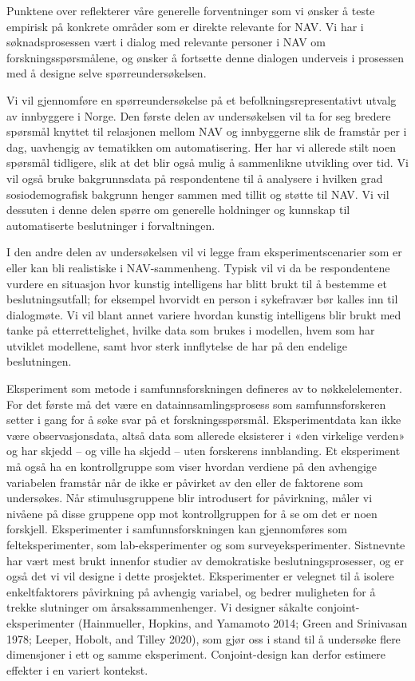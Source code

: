 \documentclass[
]{book}
\begin{document}
Punktene over reflekterer våre generelle forventninger som vi ønsker å teste empirisk på konkrete områder som er direkte relevante for NAV.
Vi har i søknadsprosessen vært i dialog med relevante personer i NAV om forskningsspørsmålene, og ønsker å fortsette denne dialogen underveis i prosessen med å designe selve spørreundersøkelsen.

Vi vil gjennomføre en spørreundersøkelse på et befolkningsrepresentativt utvalg av innbyggere i Norge.
Den første delen av undersøkelsen vil ta for seg bredere spørsmål knyttet til relasjonen mellom NAV og innbyggerne slik de framstår per i dag, uavhengig av tematikken om automatisering.
Her har vi allerede stilt noen spørsmål tidligere, slik at det blir også mulig å sammenlikne utvikling over tid.
Vi vil også bruke bakgrunnsdata på respondentene til å analysere i hvilken grad sosiodemografisk bakgrunn henger sammen med tillit og støtte til NAV.
Vi vil dessuten i denne delen spørre om generelle holdninger og kunnskap til automatiserte beslutninger i forvaltningen.

I den andre delen av undersøkelsen vil vi legge fram eksperimentscenarier som er eller kan bli realistiske i NAV-sammenheng. Typisk vil vi da be respondentene vurdere en situasjon hvor kunstig intelligens har blitt brukt til å bestemme et beslutningsutfall; for eksempel hvorvidt en person i sykefravær bør kalles inn til dialogmøte. Vi vil blant annet variere hvordan kunstig intelligens blir brukt med tanke på etterrettelighet, hvilke data som brukes i modellen, hvem som har utviklet modellene, samt hvor sterk innflytelse de har på den endelige beslutningen.

Eksperiment som metode i samfunnsforskningen defineres av to nøkkelelementer.
For det første må det være en datainnsamlingsprosess som samfunnsforskeren setter i gang for å søke svar på et forskningsspørsmål.
Eksperimentdata kan ikke være observasjonsdata, altså data som allerede eksisterer i «den virkelige verden» og har skjedd -- og ville ha skjedd -- uten forskerens innblanding.
Et eksperiment må også ha en kontrollgruppe som viser hvordan verdiene på den avhengige variabelen framstår når de ikke er påvirket av den eller de faktorene som undersøkes.
Når stimulusgruppene blir introdusert for påvirkning, måler vi nivåene på disse gruppene opp mot kontrollgruppen for å se om det er noen forskjell.
Eksperimenter i samfunnsforskningen kan gjennomføres som felteksperimenter, som lab-eksperimenter og som surveyeksperimenter.
Sistnevnte har vært mest brukt innenfor studier av demokratiske beslutningsprosesser, og er også det vi vil designe i dette prosjektet.
Eksperimenter er velegnet til å isolere enkeltfaktorers påvirkning på avhengig variabel, og bedrer muligheten for å trekke slutninger om årsakssammenhenger.
Vi designer såkalte conjoint-eksperimenter (Hainmueller, Hopkins, and Yamamoto 2014; Green and Srinivasan 1978; Leeper, Hobolt, and Tilley 2020), som gjør oss i stand til å undersøke flere dimensjoner i ett og samme eksperiment.
Conjoint-design kan derfor estimere effekter i en variert kontekst.
\end{document}
